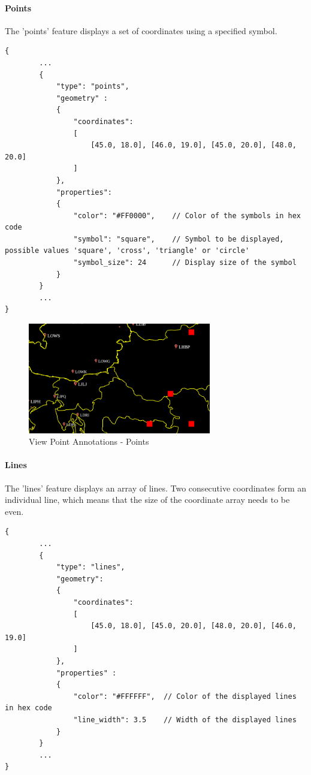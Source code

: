 
\paragraph{Points} The 'points' feature displays a set of coordinates using a specified symbol.

\begin{lstlisting}[basicstyle=\small\ttfamily]
{
        ...
        {
            "type": "points",
            "geometry" :
            {
                "coordinates": 
                [
                    [45.0, 18.0], [46.0, 19.0], [45.0, 20.0], [48.0, 20.0]
                ]
            },
            "properties":
            {
                "color": "#FF0000",    // Color of the symbols in hex code
                "symbol": "square",    // Symbol to be displayed, possible values 'square', 'cross', 'triangle' or 'circle'   
                "symbol_size": 24      // Display size of the symbol
            }
        }
        ...
}
\end{lstlisting}

\begin{figure}[H]
    \center
      \includegraphics[width=8cm]{figures/viewpoints_anno_example_points.png}
    \caption{View Point Annotations - Points} 
\end{figure}

\paragraph{Lines} The 'lines' feature displays an array of lines. 
Two consecutive coordinates form an individual line, which means that the size of the coordinate array needs to be even.

\begin{lstlisting}[basicstyle=\small\ttfamily]
{
        ...
        {
            "type": "lines",
            "geometry":
            {
                "coordinates": 
                [
                    [45.0, 18.0], [45.0, 20.0], [48.0, 20.0], [46.0, 19.0]
                ]
            },
            "properties" :
            {
                "color": "#FFFFFF",  // Color of the displayed lines in hex code
                "line_width": 3.5    // Width of the displayed lines
            }
        }
        ...
}
\end{lstlisting}

